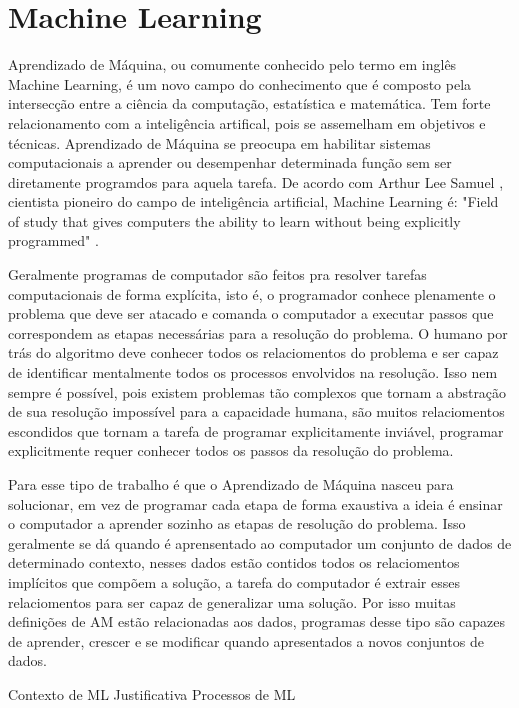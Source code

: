 \chapter{Machine Learning}

Aprendizado de Máquina, ou comumente conhecido pelo termo em inglês Machine Learning, é um novo campo do conhecimento que é composto pela intersecção entre a ciência da computação, estatística e matemática. Tem forte relacionamento  com a inteligência artifical, pois se assemelham em objetivos e técnicas. Aprendizado de Máquina se preocupa em habilitar sistemas computacionais a aprender ou desempenhar determinada função sem ser diretamente programdos para aquela tarefa. De acordo com Arthur Lee Samuel , cientista pioneiro do campo de inteligência artificial, Machine Learning é: "Field of study that gives computers the ability to learn without being explicitly programmed"  . 

Geralmente programas de computador são feitos pra resolver tarefas computacionais de forma explícita, isto é, o programador conhece plenamente o problema que deve ser atacado e comanda o computador a executar passos que correspondem as etapas necessárias para a resolução do problema. O humano por trás do algoritmo deve conhecer todos os relaciomentos do problema e ser capaz de identificar mentalmente todos os processos envolvidos na resolução. Isso nem sempre é possível, pois existem problemas tão complexos que tornam a abstração de sua resolução impossível para a capacidade humana, são muitos relaciomentos escondidos que tornam a tarefa de programar explicitamente inviável, programar explicitmente requer conhecer todos os passos da resolução do problema.

Para esse tipo de trabalho é que o Aprendizado de Máquina nasceu para solucionar, em vez de programar cada etapa de forma exaustiva a ideia é ensinar o computador a aprender sozinho as etapas de resolução do problema. Isso geralmente se dá quando é aprensentado ao computador um conjunto de dados de determinado contexto, nesses dados estão contidos todos os relaciomentos implícitos que compõem a solução, a tarefa do computador é extrair esses relaciomentos para ser capaz de generalizar uma solução. Por isso muitas definições de AM estão relacionadas aos dados, programas desse tipo são capazes de aprender, crescer e se modificar quando apresentados a novos conjuntos de dados.


Contexto de ML
Justificativa
Processos de ML

